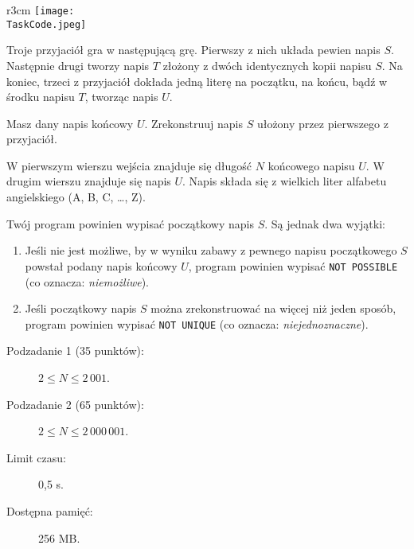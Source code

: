 \documentclass{boi2014-pl}
\renewcommand{\TaskCode}{friends}
\begin{document}
    \begin{wrapfigure}{r}{3cm}
		\texttt{[image: \\TaskCode.jpeg]}
	\end{wrapfigure}
    Troje przyjaciół gra w następującą grę.
    Pierwszy z nich układa pewien napis $S$.
    Następnie drugi tworzy napis $T$ złożony z dwóch identycznych kopii napisu $S$.
    Na koniec, trzeci z przyjaciół dokłada jedną literę na początku, na końcu, bądź w środku napisu $T$, tworząc napis $U$.

    \Task
    Masz dany napis końcowy $U$. Zrekonstruuj napis $S$ ułożony przez pierwszego z przyjaciół.

    \Input
    W pierwszym wierszu wejścia znajduje się długość $N$ końcowego napisu $U$.
    W drugim wierszu znajduje się napis $U$.
    Napis składa się z wielkich liter alfabetu angielskiego (A, B, C, \ldots{}, Z).

    \Output
    Twój program powinien wypisać początkowy napis $S$.
    Są jednak dwa wyjątki:
    \begin{enumerate}
        \item Jeśli nie jest możliwe, by w wyniku zabawy z pewnego napisu początkowego $S$ powstał podany napis końcowy $U$, program powinien wypisać {\tt NOT POSSIBLE}
          (co oznacza: \emph{niemożliwe}).
        \item Jeśli początkowy napis $S$ można zrekonstruować na więcej niż jeden sposób, program powinien wypisać {\tt NOT
          UNIQUE} (co oznacza: \emph{niejednoznaczne}).
    \end{enumerate}
    

    \Examples


    \Scoring

    \begin{description}
        \item[Podzadanie 1 (35 punktów):] $2 \le N \le 2\,001$.
        \item[Podzadanie 2 (65 punktów):] $2 \le N \le 2\,000\,001$.
    \end{description}

    \Constraints

    \begin{description}
        \item[Limit czasu:] 0,5 s.
        \item[Dostępna pamięć:] 256 MB.
    \end{description}
\end{document}
